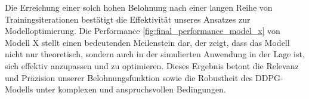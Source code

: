 Die Erreichung einer solch hohen Belohnung nach einer langen Reihe von Trainingsiterationen bestätigt die Effektivität unseres Ansatzes zur Modelloptimierung. Die Performance \ref{fig:final_performance_model_x} von Modell X stellt einen bedeutenden Meilenstein dar, der zeigt, dass das Modell nicht nur theoretisch, sondern auch in der simulierten Anwendung in der Lage ist, sich effektiv anzupassen und zu optimieren. Dieses Ergebnis betont die Relevanz und Präzision unserer Belohnungsfunktion sowie die Robustheit des DDPG-Modells unter komplexen und anspruchsvollen Bedingungen.

